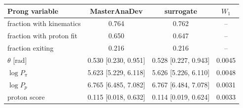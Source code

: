 \begin{tabular}{lccc}
\toprule
Prong variable & MasterAnaDev & surrogate & $W_1$ \\
\midrule
fraction with kinematics & 0.764 & 0.762 & -- \\
fraction with proton fit & 0.650 & 0.647 & -- \\
fraction exiting & 0.216 & 0.216 & -- \\
$\theta$ [rad] & 0.530 [0.230, 0.951] & 0.528 [0.227, 0.943] & 0.0045 \\
$\log P_\pi$ & 5.623 [5.229, 6.118] & 5.626 [5.226, 6.110] & 0.0048 \\
$\log P_p$ & 6.765 [6.485, 7.082] & 6.767 [6.484, 7.078] & 0.0031 \\
proton score & 0.115 [0.018, 0.632] & 0.114 [0.019, 0.624] & 0.0033 \\
\bottomrule
\end{tabular}
